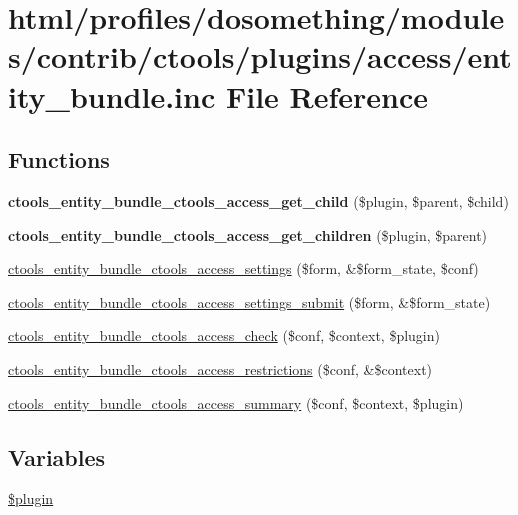 \hypertarget{entity__bundle_8inc}{
\section{html/profiles/dosomething/modules/contrib/ctools/plugins/access/entity\_\-bundle.inc File Reference}
\label{entity__bundle_8inc}
}
\subsection*{Functions}
\begin{DoxyCompactItemize}
\item 
\hypertarget{entity__bundle_8inc_a7cd17edf6555e5c5951760f762f88161}{
{\bfseries ctools\_\-entity\_\-bundle\_\-ctools\_\-access\_\-get\_\-child} (\$plugin, \$parent, \$child)}
\label{entity__bundle_8inc_a7cd17edf6555e5c5951760f762f88161}

\item 
\hypertarget{entity__bundle_8inc_a72b4dbc966a5366fe787b3e359432c09}{
{\bfseries ctools\_\-entity\_\-bundle\_\-ctools\_\-access\_\-get\_\-children} (\$plugin, \$parent)}
\label{entity__bundle_8inc_a72b4dbc966a5366fe787b3e359432c09}

\item 
\hyperlink{entity__bundle_8inc_a7b36ad469be2bc71a28ba43fb19f7410}{ctools\_\-entity\_\-bundle\_\-ctools\_\-access\_\-settings} (\$form, \&\$form\_\-state, \$conf)
\item 
\hyperlink{entity__bundle_8inc_a8d3c688375e0c75f155050ba85f36485}{ctools\_\-entity\_\-bundle\_\-ctools\_\-access\_\-settings\_\-submit} (\$form, \&\$form\_\-state)
\item 
\hyperlink{entity__bundle_8inc_a8ac940a6ec86672e5e5b135ba5275fd3}{ctools\_\-entity\_\-bundle\_\-ctools\_\-access\_\-check} (\$conf, \$context, \$plugin)
\item 
\hyperlink{entity__bundle_8inc_af8b65e87c63f804f7bbd93e5e3a17ea1}{ctools\_\-entity\_\-bundle\_\-ctools\_\-access\_\-restrictions} (\$conf, \&\$context)
\item 
\hyperlink{entity__bundle_8inc_aa413c3bc5e958f83359460f29f8401e3}{ctools\_\-entity\_\-bundle\_\-ctools\_\-access\_\-summary} (\$conf, \$context, \$plugin)
\end{DoxyCompactItemize}
\subsection*{Variables}
\begin{DoxyCompactItemize}
\item 
\hyperlink{entity__bundle_8inc_ada8a7130088351710bb02ed622d6bf65}{\$plugin}
\end{DoxyCompactItemize}


